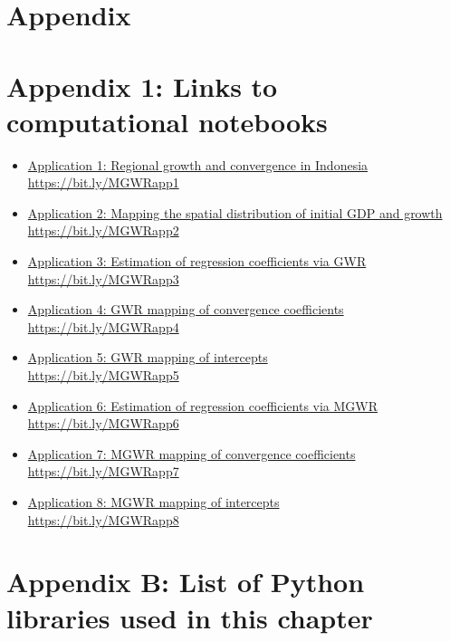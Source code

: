\documentclass[smallextended, natbib]{svjour3}       %
\begin{document}
\newpage

\section*{Appendix}

\section*{Appendix 1: Links to computational notebooks}

\begin{itemize}
    \item \href{https://colab.research.google.com/drive/1Bsr20h4SX9F8TNiaLNO5eHNF5GI5jdps?usp=sharing}{Application 1: Regional growth and convergence in Indonesia \\ https://bit.ly/MGWRapp1}
    \item \href{https://bit.ly/MGWRapp2}{Application 2: Mapping the spatial distribution of initial GDP and growth \\ https://bit.ly/MGWRapp2}
    \item \href{https://bit.ly/MGWRapp3}{Application 3: Estimation of regression coefficients via GWR \\ https://bit.ly/MGWRapp3 }
    \item \href{https://bit.ly/MGWRapp4}{Application 4: GWR mapping of convergence coefficients \\ https://bit.ly/MGWRapp4}
    \item \href{https://bit.ly/MGWRapp5}{Application 5: GWR mapping of intercepts \\ https://bit.ly/MGWRapp5}
    \item \href{https://bit.ly/MGWRapp6}{Application 6: Estimation of regression coefficients via MGWR \\ https://bit.ly/MGWRapp6}
    \item \href{https://bit.ly/MGWRapp7}{Application 7: MGWR mapping of convergence coefficients \\ https://bit.ly/MGWRapp7}
    \item \href{https://bit.ly/MGWRapp8}{Application 8: MGWR mapping of intercepts \\ https://bit.ly/MGWRapp8}
\end{itemize}

\newpage

\section*{Appendix B: List of Python libraries used in this chapter}
\end{document}
